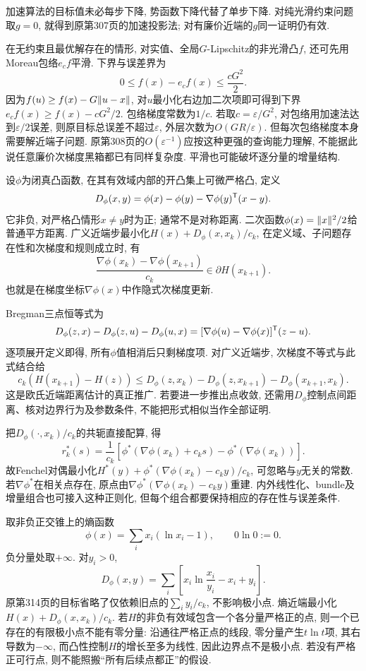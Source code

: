 加速算法的目标值未必每步下降, 势函数下降代替了单步下降. 对纯光滑约束问题取$g=0$, 就得到原第307页的加速投影法; 对有廉价近端的$g$同一证明仍有效.

在无约束且最优解存在的情形, 对实值、全局$G$-Lipschitz的非光滑凸$f$, 还可先用Moreau包络$e_cf$平滑. 下界与误差界为
\[
 0\le f(x)-e_cf(x)\le\frac{cG^2}{2}.
\]
因为$f(u)\ge f(x)-G\lVert u-x\rVert$, 对$u$最小化右边加二次项即可得到下界$e_cf(x)\ge f(x)-cG^2/2$. 包络梯度常数为$1/c$. 若取$c=\varepsilon/G^2$, 对包络用加速法达到$\varepsilon/2$误差, 则原目标总误差不超过$\varepsilon$, 外层次数为$O(GR/\varepsilon)$. 但每次包络梯度本身需要解近端子问题. 原第308页的$O(\varepsilon^{-1})$应按这种更强的查询能力理解, 不能据此说任意廉价次梯度黑箱都已有同样复杂度. 平滑也可能破坏逐分量的增量结构.

设$\phi$为闭真凸函数, 在其有效域内部的开凸集上可微严格凸, 定义
\[
 D_\phi(x,y)=\phi(x)-\phi(y)-\nabla\phi(y)^{\mathsf T}(x-y).
\]
它非负, 对严格凸情形$x\ne y$时为正; 通常不是对称距离. 二次函数$\phi(x)=\lVert x\rVert^2/2$给普通平方距离. 广义近端步最小化$H(x)+D_\phi(x,x_k)/c_k$, 在定义域、子问题存在性和次梯度和规则成立时, 有
\[
 \frac{\nabla\phi(x_k)-\nabla\phi(x_{k+1})}{c_k}\in\partial H(x_{k+1}).
\]
也就是在梯度坐标$\nabla\phi(x)$中作隐式次梯度更新.

Bregman三点恒等式为
\begin{equation}\label{eq:bregman-threepoint}
 D_\phi(z,x)-D_\phi(z,u)-D_\phi(u,x)
 =[\nabla\phi(u)-\nabla\phi(x)]^{\mathsf T}(z-u).
\end{equation}
逐项展开定义即得, 所有$\phi$值相消后只剩梯度项. 对广义近端步, 次梯度不等式与此式结合给
\[
 c_k(H(x_{k+1})-H(z))\le
 D_\phi(z,x_k)-D_\phi(z,x_{k+1})-D_\phi(x_{k+1},x_k).
\]
这是欧氏近端距离估计的真正推广. 若要进一步推出点收敛, 还需用$D_\phi$控制点间距离、核对边界行为及参数条件, 不能把形式相似当作全部证明.

把$D_\phi(\cdot,x_k)/c_k$的共轭直接配算, 得
\[
 r_k^*(s)=\frac1{c_k}\left[\phi^*(\nabla\phi(x_k)+c_k s)-\phi^*(\nabla\phi(x_k))\right].
\]
故Fenchel对偶最小化$H^*(y)+\phi^*(\nabla\phi(x_k)-c_k y)/c_k$, 可忽略与$y$无关的常数. 若$\nabla\phi^*$在相关点存在, 原点由$\nabla\phi^*(\nabla\phi(x_k)-c_k y)$重建. 内外线性化、bundle及增量组合也可接入这种正则化, 但每个组合都要保持相应的存在性与误差条件.

取非负正交锥上的熵函数
\[
 \phi(x)=\sum_i x_i(\ln x_i-1),\qquad0\ln0:=0.
\]
负分量处取$+\infty$. 对$y_i>0$,
\[
 D_\phi(x,y)=\sum_i\left[x_i\ln\frac{x_i}{y_i}-x_i+y_i\right].
\]
原第314页的目标省略了仅依赖旧点的$\sum_i y_i/c_k$, 不影响极小点. 熵近端最小化$H(x)+D_\phi(x,x_k)/c_k$. 若$H$的非负有效域包含一个各分量严格正的点, 则一个已存在的有限极小点不能有零分量: 沿通往严格正点的线段, 零分量产生$t\ln t$项, 其右导数为$-\infty$, 而凸性控制$H$的增长至多为线性, 因此边界点不是极小点. 若没有严格正可行点, 则不能照搬“所有后续点都正”的假设.

